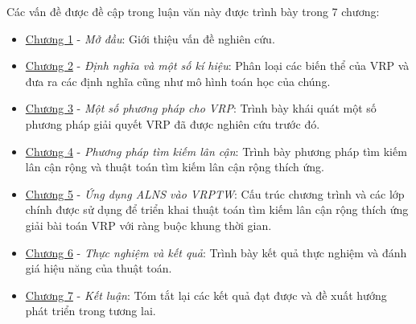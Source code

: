 Các vấn đề được đề cập trong luận văn này được trình bày trong 7 chương: 
\begin{itemize}
  \item \hyperref[chap:introduction]{Chương 1} - \textit{Mở đầu}: Giới thiệu vấn đề nghiên cứu.
  \item \hyperref[chap:model]{Chương 2} - \textit{Định nghĩa và một số kí hiệu}: Phân loại các biến thể của VRP và đưa ra các định nghĩa cũng như mô hình toán học của chúng.
  \item \hyperref[chap:solution]{Chương 3} - \textit{Một số phương pháp cho VRP}: Trình bày khái quát một số  phương pháp giải quyết VRP đã được nghiên cứu trước đó.
  \item \hyperref[chap:search]{Chương 4} - \textit{Phương pháp tìm kiếm lân cận}: Trình bày phương pháp tìm kiếm lân cận rộng và thuật toán tìm kiếm lân cận rộng thích ứng.
  \item \hyperref[chap:application]{Chương 5} - \textit{Ứng dụng ALNS vào VRPTW}: Cấu trúc chương trình và các lớp chính được sử dụng để triển khai thuật toán tìm kiếm lân cận rộng thích ứng giải bài toán VRP với ràng buộc khung thời gian.
  \item \hyperref[chap:experiment]{Chương 6} - \textit{Thực nghiệm và kết quả}: Trình bày kết quả thực nghiệm và đánh giá hiệu năng của thuật toán.
  \item \hyperref[chap:conclusion]{Chương 7} - \textit{Kết luận}: Tóm tắt lại các kết quả đạt được và đề xuất hướng phát triển trong tương lai.
\end{itemize}
